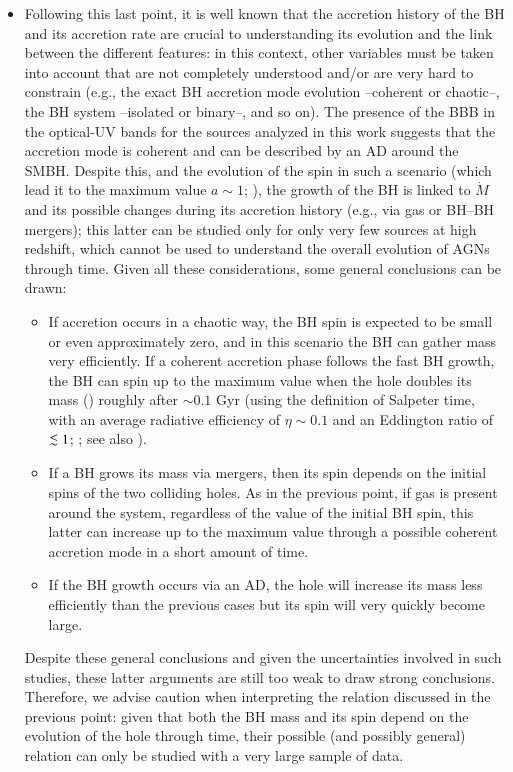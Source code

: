 \documentclass[]{aa}
\def\spose#1{\hbox to 0pt{#1\hss}}
\newcommand\lsim{\mathrel{\spose{\lower 3pt\hbox{$\mathchar"218$}}
     \raise 2.0pt\hbox{$\mathchar"13C$}}}
\begin{document}
\begin{itemize}
	\item Following this last point, it is well known that the accretion history of the BH and its accretion rate are crucial to understanding its evolution and the link between the different features: in this context, other variables must be taken into account that are not completely understood and/or are very hard to constrain (e.g., the exact BH accretion mode evolution --coherent or chaotic--, the BH system --isolated or binary--, and so on). The presence of the BBB in the optical-UV bands for the sources analyzed in this work suggests that the accretion mode is coherent and can be described by an AD around the SMBH. Despite this, and the evolution of the spin in such a scenario (which lead it to the maximum value $a \sim 1$; \citealt{Thorn74}), the growth of the BH is linked to $\dot{M}$ and its possible changes during its accretion history (e.g., via gas or BH--BH mergers); this latter can be studied only for only very few sources at high redshift, which cannot be used to understand the overall evolution of AGNs through time. Given all these considerations, some general conclusions can be drawn:
	\begin{itemize}
		\item If accretion occurs in a chaotic way, the BH spin is expected to be small or even approximately zero, and in this scenario the BH can gather mass very efficiently. If a coherent accretion phase follows the fast BH growth, the BH can spin up to the maximum value when the hole doubles its mass (\citealt{Thorn74}) roughly after $\sim 0.1$ Gyr (using the definition of Salpeter time, with an average radiative efficiency of $\eta \sim 0.1$ and an Eddington ratio of $\lsim 1$; \citealt{Salp}; see also \citealt{Campitib}).
		\item If a BH grows its mass via mergers, then its spin depends on the initial spins of the two colliding holes. As in the previous point, if gas is present around the system, regardless of the value of the initial BH spin, this latter can increase up to the maximum value through a possible coherent accretion mode in a short amount of time.
		\item If the BH growth occurs via an AD, the hole will increase its mass less efficiently than the previous cases but its spin will very quickly become large.\\
	\end{itemize} 
	
	Despite these general conclusions and given the uncertainties involved in such studies, these latter arguments are still too weak to draw strong conclusions. Therefore, we advise caution when interpreting the relation discussed in the previous point: given that both the BH mass and its spin depend on the evolution of the hole through time, their possible (and possibly general) relation can only be studied with a very large sample of data.


\end{itemize}
\end{document}
